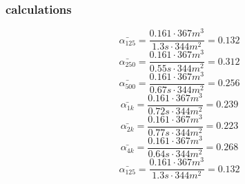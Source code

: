 \documentclass{article}
\begin{document}
\subsubsection{calculations}
$$\bar{\alpha_{125}}=\frac{0.161\cdot 367m^3}{1.3s\cdot 344m^2}=0.132$$
$$\bar{\alpha_{250}}=\frac{0.161\cdot 367m^3}{0.55s\cdot 344m^2}=0.312$$
$$\bar{\alpha_{500}}=\frac{0.161\cdot 367m^3}{0.67s\cdot 344m^2}=0.256$$
$$\bar{\alpha_{1k}}=\frac{0.161\cdot 367m^3}{0.72s\cdot 344m^2}=0.239$$
$$\bar{\alpha_{2k}}=\frac{0.161\cdot 367m^3}{0.77s\cdot 344m^2}=0.223$$
$$\bar{\alpha_{4k}}=\frac{0.161\cdot 367m^3}{0.64s\cdot 344m^2}=0.268$$
$$\bar{\alpha_{125}}=\frac{0.161\cdot 367m^3}{1.3s\cdot 344m^2}=0.132$$
\end{document}
